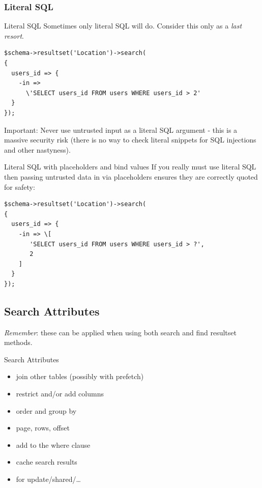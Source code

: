 \subsubsection{Literal SQL}
\begin{frame}[fragile]{Literal SQL}
Sometimes only literal SQL will do. 
Consider this only as a \emph{last resort}.

\begin{lstlisting}
$schema->resultset('Location')->search(
{
  users_id => {
    -in =>
      \'SELECT users_id FROM users WHERE users_id > 2'
  }
});
\end{lstlisting}
\end{frame}

Important: Never use untrusted input as a literal SQL argument - this is a
massive security risk (there is no way to check literal snippets for SQL
injections and other nastyness).

\begin{frame}[fragile]{Literal SQL with placeholders and bind values}
If you really must use literal SQL then passing untrusted data in via placeholders ensures they are correctly quoted for safety:

\begin{lstlisting}
$schema->resultset('Location')->search(
{
  users_id => {
    -in => \[
       'SELECT users_id FROM users WHERE users_id > ?',
       2
    ]
  }
});
\end{lstlisting}
\end{frame}

\subsection{Search Attributes}

\emph{Remember}: these can be applied when using both search and find resultset
methods.

\begin{frame}{Search Attributes}
\begin{itemize}
\item join other tables (possibly with prefetch)
\item restrict and/or add columns
\item order and group by
\item page, rows, offset
\item add to the where clause
\item cache search results
\item for update/shared/…
\end{itemize}
\end{frame}

